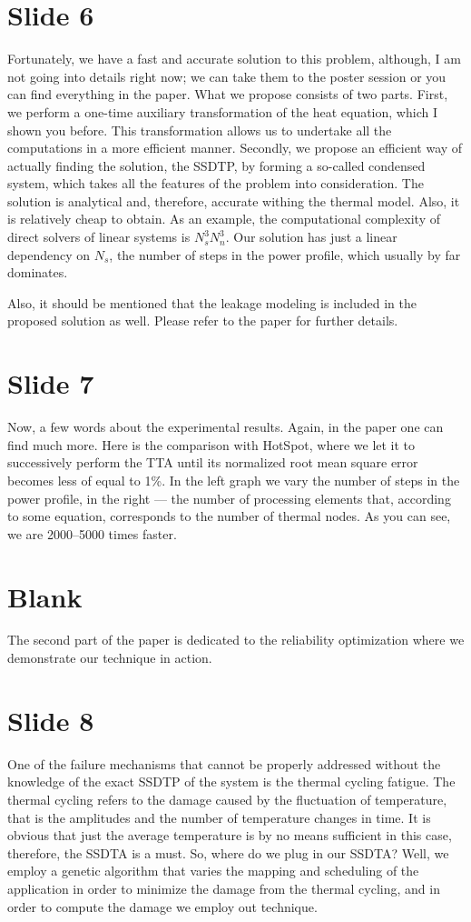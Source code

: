 \documentclass[11pt,a4paper]{article}
\begin{document}
\section{Slide 6}
Fortunately, we have a fast and accurate solution to this problem, although, I am not going into details right now; we can take them to the poster session or you can find everything in the paper. What we propose consists of two parts. First, we perform a one-time auxiliary transformation of the heat equation, which I shown you before. This transformation allows us to undertake all the computations in a more efficient manner. Secondly, we propose an efficient way of actually finding the solution, the SSDTP, by forming a so-called condensed system, which takes all the features of the problem into consideration. The solution is analytical and, therefore, accurate withing the thermal model. Also, it is relatively cheap to obtain. As an example, the computational complexity of direct solvers of linear systems is $N_s^3 N_n^3$. Our solution has just a linear dependency on $N_s$, the number of steps in the power profile, which usually by far dominates.

Also, it should be mentioned that the leakage modeling is included in the proposed solution as well. Please refer to the paper for further details.

\section{Slide 7}
Now, a few words about the experimental results. Again, in the paper one can find much more. Here is the comparison with HotSpot, where we let it to successively perform the TTA until its normalized root mean square error becomes less of equal to 1\%. In the left graph we vary the number of steps in the power profile, in the right --- the number of processing elements that, according to some equation, corresponds to the number of thermal nodes. As you can see, we are 2000--5000 times faster.

\section{Blank}
The second part of the paper is dedicated to the reliability optimization where we demonstrate our technique in action.

\section{Slide 8}
One of the failure mechanisms that cannot be properly addressed without the knowledge of the exact SSDTP of the system is the thermal cycling fatigue. The thermal cycling refers to the damage caused by the fluctuation of temperature, that is the amplitudes and the number of temperature changes in time. It is obvious that just the average temperature is by no means sufficient in this case, therefore, the SSDTA is a must. So, where do we plug in our SSDTA? Well, we employ a genetic algorithm that varies the mapping and scheduling of the application in order to minimize the damage from the thermal cycling, and in order to compute the damage we employ out technique.
\end{document}
